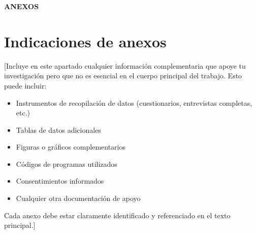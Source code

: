 \appendix

{}

\thispagestyle{plain}
\vspace*{\fill}
\begin{center}
{\color{uaxblue}\bfseries\fontsize{46}{54}\selectfont ANEXOS}
\end{center}
\vspace*{\fill}
\cleardoublepage

\section*{Indicaciones de anexos}

[Incluye en este apartado cualquier información complementaria que apoye tu investigación pero
que no es esencial en el cuerpo principal del trabajo. Esto puede incluir:

\begin{itemize}
    \item Instrumentos de recopilación de datos (cuestionarios, entrevistas completas, etc.)
    \item Tablas de datos adicionales
    \item Figuras o gráficos complementarios
    \item Códigos de programas utilizados
    \item Consentimientos informados
    \item Cualquier otra documentación de apoyo
\end{itemize}

Cada anexo debe estar claramente identificado y referenciado en el texto principal.]
